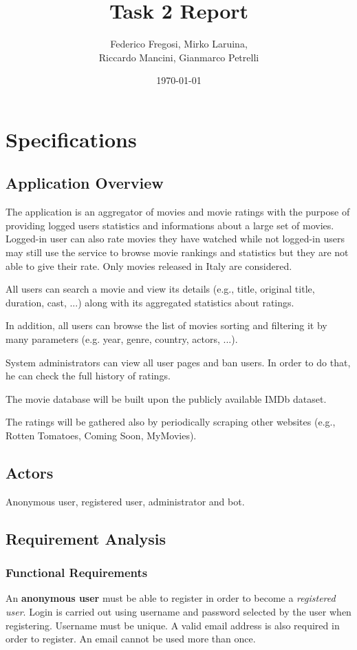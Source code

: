\documentclass[11pt]{article}
\title{Task 2 Report}
\date{\today}
\author{Federico Fregosi, Mirko Laruina,\\
        Riccardo Mancini, Gianmarco Petrelli}
\begin{document}
\maketitle
\vfill
\tableofcontents
\vfill
\clearpage
\setcounter{page}{1}

\section{Specifications}

\subsection{Application Overview}
The application is an aggregator of movies and movie ratings with the purpose 
of providing logged users statistics and informations about a large set of movies.
Logged-in user can also rate movies they have watched while not logged-in users 
may still use the service to browse movie rankings and statistics but they are not
able to give their rate. Only movies released in Italy are considered.

All users can search a movie and view its details (e.g., title, original title, duration, 
cast, ...) along with its aggregated statistics about ratings. 

In addition, all users can browse the list of movies sorting and filtering it by many parameters
(e.g. year, genre, country, actors, ...).

System administrators can view all user pages and ban users. In order to do that, he can 
check the full history of ratings.

The movie database will be built upon the publicly available IMDb dataset.

The ratings will be gathered also by periodically scraping other websites 
(e.g., Rotten Tomatoes, Coming Soon, MyMovies).

\subsection{Actors}
Anonymous user, registered user, administrator and bot.

\subsection{Requirement Analysis}

\subsubsection{Functional Requirements}
An \textbf{anonymous user} must be able to register in order to become a 
\textit{registered user}. Login is carried out using username and password selected 
by the user when registering. Username must be unique. A valid email address is
also required in order to register. An email cannot be used more than once.
\end{document}
